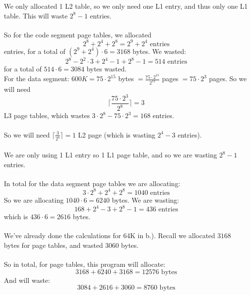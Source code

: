 \documentclass{article}
\begin{document}
\begin{enumerate}[label=\alph*)]
We only allocated 1 L2 table, so we only need one L1 entry, and thus only one L1 table. This will waste $2^8 - 1$ entries. \\\\
So for the code segment page tables, we allocated
\[
2^8 + 2^4 + 2^8 = 2^9 + 2^4 \mbox{ entries}
\] entries, for a total of $(2^9 + 2^4) \cdot 6 = 3168$ bytes. We wasted: \\
\[
2^8 - 2^2 \cdot 3 + 2^4 - 1 + 2^8 - 1 = 514 \mbox { entries}
\]
for a total of $514 \cdot 6 = 3084$ bytes wasted. \\
For the data segment: $600K = 75 \cdot 2^{15}$ bytes $= \frac{75 \cdot 2^{15}}{2^12}$ pages $= 75 \cdot 2^3$ pages. So we will need \\
\[
\lceil\frac{75 \cdot 2^3}{2^8}\rceil = 3 
\]
L3 page tables, which wastes $3 \cdot 2^8 -75 \cdot 2^3  = 168$ entries. \\\\ So we will need $\lceil \frac{3}{2^4} \rceil = 1$ L2 page (which is wasting $2^4 - 3$ entries).\\\\ We are only using 1 L1 entry so 1 L1 page table, and so we are wasting $2^8 - 1$ entries. \\\\
In total for the data segment page tables we are allocating:\\
\[
3 \cdot 2^8 + 2^4 + 2^8 = 1040 \mbox{ entries}
\]
So we are allocating $1040 \cdot 6 = 6240$ bytes. We are wasting: \\
\[
168 + 2^4 - 3 + 2^8 - 1 = 436 \mbox{ entries}
\]
which is $436 \cdot 6 = 2616$ bytes. \\\\
We've already done the calculations for 64K in b.). Recall we allocated $3168$ bytes for page tables, and wasted $3060$ bytes. \\\\
So in total, for page tables, this program will allocate: \\
\[
3168 + 6240 + 3168 = 12576 \mbox{ bytes}
\] 
And will waste: \\
\[
3084 + 2616 + 3060 = 8760 \mbox{ bytes}
\]
\end{enumerate}
\end{document}
